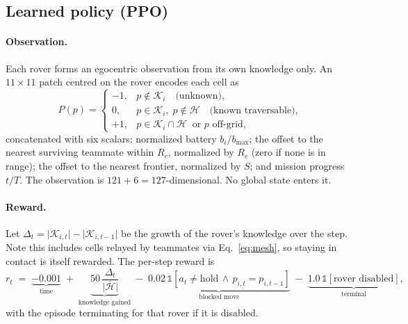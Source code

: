 \documentclass[11pt]{article}
\begin{document}
\subsection{Learned policy (PPO)}
\label{sec:rl}

\paragraph{Observation.}
Each rover forms an egocentric observation from its own knowledge only. An
$11 \times 11$ patch centred on the rover encodes each cell as
\begin{equation}
P(p) =
\begin{cases}
-1, & p \notin \mathcal{K}_i \quad \text{(unknown)},\\
0,  & p \in \mathcal{K}_i,\; p \notin \mathcal{H} \quad \text{(known traversable)},\\
+1, & p \in \mathcal{K}_i \cap \mathcal{H} \ \text{ or } p \text{ off-grid},
\end{cases}
\end{equation}
concatenated with six scalars: normalized battery $b_i / b_{\max}$; the offset
to the nearest surviving teammate within $R_c$, normalized by $R_c$ (zero if
none is in range); the offset to the nearest frontier, normalized by $S$; and
mission progress $t/T$. The observation is $121 + 6 = 127$-dimensional. No
global state enters it.

\paragraph{Reward.}
Let $\Delta_t = \lvert \mathcal{K}_{i,t} \rvert - \lvert \mathcal{K}_{i,t-1} \rvert$
be the growth of the rover's knowledge over the step. Note this includes cells
relayed by teammates via Eq.~\eqref{eq:mesh}, so staying in contact is itself
rewarded. The per-step reward is
\begin{equation}
r_t \;=\; \underbrace{-0.001}_{\text{time}}
  \;+\; \underbrace{50\,\frac{\Delta_t}{\lvert \overline{\mathcal{H}} \rvert}}_{\text{knowledge gained}}
  \;-\; \underbrace{0.02\,\mathbb{1}[a_t \ne \text{hold} \,\wedge\, p_{i,t} = p_{i,t-1}]}_{\text{blocked move}}
  \;-\; \underbrace{1.0\,\mathbb{1}[\text{rover disabled}]}_{\text{terminal}} ,
\end{equation}
with the episode terminating for that rover if it is disabled.
\end{document}
